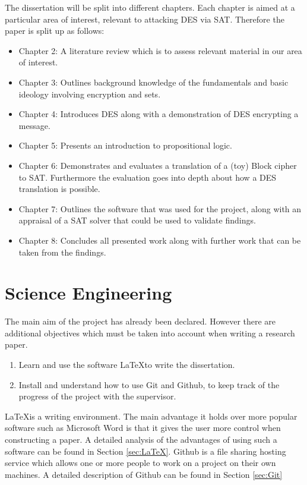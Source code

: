 \documentclass[11pt,a4paper, notitlepage]{report}
\begin{document}
The dissertation will be split into different chapters. Each chapter is aimed at a particular area of interest, relevant to attacking DES via SAT. Therefore the paper is split up as follows: 

\begin{itemize}
  \item Chapter 2: A literature review which is to assess relevant material in our area of interest. 
  \item Chapter 3: Outlines background knowledge of the fundamentals and basic ideology involving encryption and sets.
  \item Chapter 4: Introduces DES along with a demonstration of DES encrypting a message.
  \item Chapter 5: Presents an introduction to propositional logic.
  \item Chapter 6: Demonstrates and evaluates a translation of a (toy) Block cipher to SAT. Furthermore the evaluation goes into depth about how a DES translation is possible.
  \item Chapter 7: Outlines the software that was used for the project, along with an appraisal of a SAT solver that could be used to validate findings.
  \item Chapter 8: Concludes all presented work along with further work that can be taken from the findings. 
\end{itemize}


\section{Science Engineering}
\label{sec:SciEng}

The main aim of the project has already been declared. However there are additional objectives which must be taken into account when writing a research paper.
\begin{enumerate}
\item Learn and use the software \LaTeX \space to write the dissertation.
\item Install and understand how to use Git and Github, to keep track of the progress of the project with the supervisor.
\end{enumerate}
\LaTeX \space is a writing environment. The main advantage it holds over more popular software such as Microsoft Word is that it gives the user more control when constructing a paper. A detailed analysis of the advantages of using such a software can be found in Section \ref{sec:LaTeX}.
Github is a file sharing hosting service which allows one or more people to work on a project on their own machines. A detailed description of Github can be found in Section \ref{sec:Git}
\end{document}

